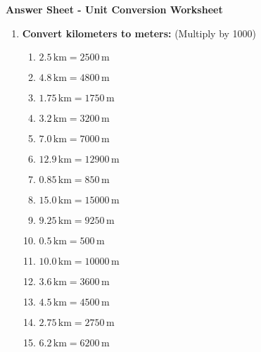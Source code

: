 \documentclass[12pt]{article}
\begin{document}
\vfill
\newpage

\pagestyle{answersheetstyle}

\begin{center}
    \Large \textbf{Answer Sheet - Unit Conversion Worksheet}
\end{center}
\vspace{10pt}

\begin{enumerate}
    \item \textbf{Convert kilometers to meters:}
    (Multiply by 1000)
    \begin{multicols}{2}
    \begin{enumerate}
        \item \(2.5 \, \text{km} = 2500 \, \text{m}\)
        \item \(4.8 \, \text{km} = 4800 \, \text{m}\)
        \item \(1.75 \, \text{km} = 1750 \, \text{m}\)
        \item \(3.2 \, \text{km} = 3200 \, \text{m}\)
        \item \(7.0 \, \text{km} = 7000 \, \text{m}\)
        \item \(12.9 \, \text{km} = 12900 \, \text{m}\)
        \item \(0.85 \, \text{km} = 850 \, \text{m}\)
        \item \(15.0 \, \text{km} = 15000 \, \text{m}\)
        \item \(9.25 \, \text{km} = 9250 \, \text{m}\)
        \item \(0.5 \, \text{km} = 500 \, \text{m}\)
        \item \(10.0 \, \text{km} = 10000 \, \text{m}\)
        \item \(3.6 \, \text{km} = 3600 \, \text{m}\)
        \item \(4.5 \, \text{km} = 4500 \, \text{m}\)
        \item \(2.75 \, \text{km} = 2750 \, \text{m}\)
        \item \(6.2 \, \text{km} = 6200 \, \text{m}\)
    \end{enumerate}
    \end{multicols}


\end{enumerate}
\end{document}
